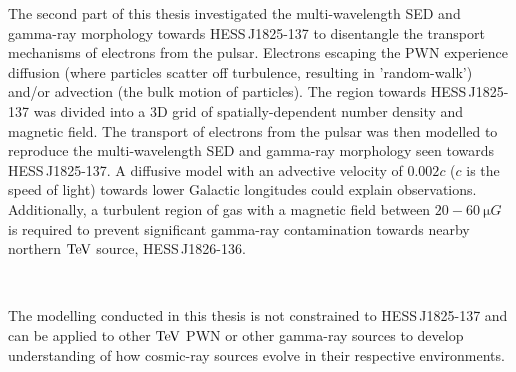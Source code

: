 The second part of this thesis investigated the multi-wavelength SED and gamma-ray morphology towards \mbox{HESS\,J1825-137} to disentangle the transport mechanisms of electrons from the pulsar. Electrons escaping the PWN experience diffusion (where particles scatter off turbulence, resulting in 'random-walk') and/or advection (the bulk motion of particles). The region towards \mbox{HESS\,J1825-137} was divided into a 3D grid of spatially-dependent number density and magnetic field. The transport of electrons from the pulsar was then modelled to reproduce the multi-wavelength SED and gamma-ray morphology seen towards \mbox{HESS\,J1825-137}. A diffusive model with an advective velocity of $0.002c$ ($c$ is the speed of light) towards lower Galactic longitudes could explain observations. Additionally, a turbulent region of gas with a magnetic field between $20-60~\si{\micro G}$ is required to prevent significant gamma-ray contamination towards nearby northern $\TeV$ source, \mbox{HESS\,J1826-136}.
\par~\par
The modelling conducted in this thesis is not constrained to \mbox{HESS\,J1825-137} and can be applied to other $\TeV$ PWN or other gamma-ray sources to develop understanding of how cosmic-ray sources evolve in their respective environments.